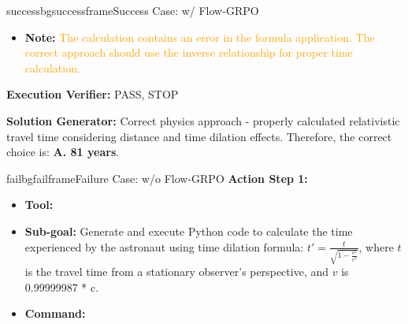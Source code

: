\begin{small}
\begin{center}
\begin{casebox}{successbg}{successframe}{Success Case: \model w/ Flow-GRPO}
\begin{itemize}[nosep, leftmargin=*]
\begin{casecode}{successbg}
\hspace{0mm}lorentz\_factor = 1 / math.sqrt(1 - velocity\_factor**2)
\\

        
\hspace{0mm}\# Step 3: Calculate the perceived time for the astronaut

        \end{casecode}
        \begin{casecode}{successbg}

\hspace{0mm}perceived\_time = travel\_time * lorentz\_factor
\\

\hspace{0mm}\# Print the results

\hspace{0mm}print(f"The spacecraft will take {travel\_time:.2f} years to reach Earth.")

\hspace{0mm}print(f"Due to time dilation, the astronaut will perceive {perceived\_time:.2f} years passing.")
\end{casecode}
        The spacecraft will take 165000.02 years to reach Earth. Due to time dilation, the astronaut will perceive 323591675.56 years passing.
        \item \textbf{Note:} \textcolor{orange}{The calculation contains an error in the formula application. The correct approach should use the inverse relationship for proper time calculation.}
    \end{itemize}

    \vspace{1em}

    \textbf{Execution Verifier:} \textcolor{successframe}{PASS, STOP}

    \vspace{1em}

    \textbf{Solution Generator:} \textcolor{successframe}{Correct physics approach - properly calculated relativistic travel time considering distance and time dilation effects. Therefore, the correct choice is: \textbf{A. 81 years}.}

\end{casebox}

\begin{casebox}{failbg}{failframe}{Failure Case: \model w/o Flow-GRPO}
    \textbf{Action Step 1:}
    \begin{itemize}[nosep, leftmargin=*]
        \item \textbf{Tool:} 
        \item \textbf{Sub-goal:} Generate and execute Python code to calculate the time experienced by the astronaut using time dilation formula: $t' = \frac{t}{\sqrt{1 - \frac{v^2}{c^2}}}$, where $t$ is the travel time from a stationary observer's perspective, and $v$ is 0.99999987 * c.
        \item \textbf{Command:}


\end{itemize}
\end{casebox}
\end{center}
\end{small}
